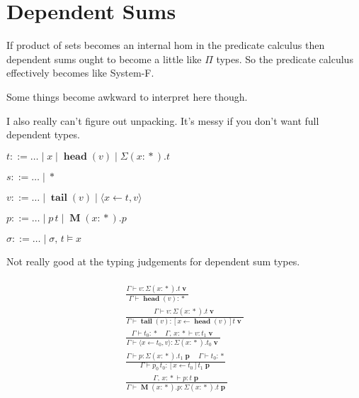 \documentclass[twocolumn]{scrartcl}
\newcommand{\bnfdef}{\mathbin{::=}}
\DeclareMathOperator{\val}{\textbf{v}}
\DeclareMathOperator{\prd}{\textbf{p}}
\DeclareMathOperator{\prop}{*}
\DeclareMathOperator{\head}{\textbf{head}}
\DeclareMathOperator{\tail}{\textbf{tail}}
\DeclareMathOperator{\Forall}{\textbf{M}}
\DeclareMathOperator{\update}{\leftarrow}
\begin{document}
\section*{Dependent Sums}

If product of sets becomes an internal hom in the predicate calculus
then dependent sums ought to become a little like \(\Pi\) types.  So
the predicate calculus effectively becomes like System-F.

Some things become awkward to interpret here though.

I also really can't figure out unpacking. It's messy if you don't want
full dependent types.

\begin{description}[nosep]
\item[Types] \hfill \( t \bnfdef \ldots \mid x \mid \head(v) \mid \Sigma (x \colon \prop). t \)
\item[Sorts] \hfill \( s \bnfdef \ldots \mid \prop \)
\item[Values] \hfill \( v \bnfdef \ldots \mid \tail(v) \mid \langle x \update t , v \rangle \)
\item[Predicates] \hfill \( p \bnfdef \ldots \mid p \, t \mid \Forall (x \colon \prop). p \)
\item[Substitutions] \hfill \( \sigma \bnfdef \ldots \mid \sigma , \, t \models x \)
\end{description}

Not really good at the typing judgements for dependent sum types.

\begin{multline*}
  \\
\frac{
  \Gamma \vdash v \colon \Sigma (x \colon \prop). t \val
}{
  \Gamma \vdash \head(v) \colon \prop
}\\
\frac{
  \Gamma \vdash v \colon \Sigma (x \colon \prop). t \val
}{
  \Gamma \vdash \tail(v) \colon [x \update \head(v)] t \val
}\\
\frac{
  \Gamma \vdash t_0 \colon \prop \quad
  \Gamma , \, x \colon \prop \vdash v \colon t_1 \val
}{
  \Gamma \vdash \langle x \update t_0 , v \rangle \colon \Sigma (x \colon \prop). t_0 \val
}\\
\frac{
  \Gamma \vdash p \colon \Sigma (x\colon \prop). t_1 \prd \quad
  \Gamma \vdash t_0 \colon \prop
}{
  \Gamma \vdash p_0 \, t_0 \colon [x \update t_0] t_1 \prd
}\\
\frac{
  \Gamma , \, x \colon \prop \vdash p \colon t \prd
}{
  \Gamma \vdash \Forall (x \colon \prop). p \colon \Sigma (x\colon \prop). t \prd
}\\
\end{multline*}
\end{document}
